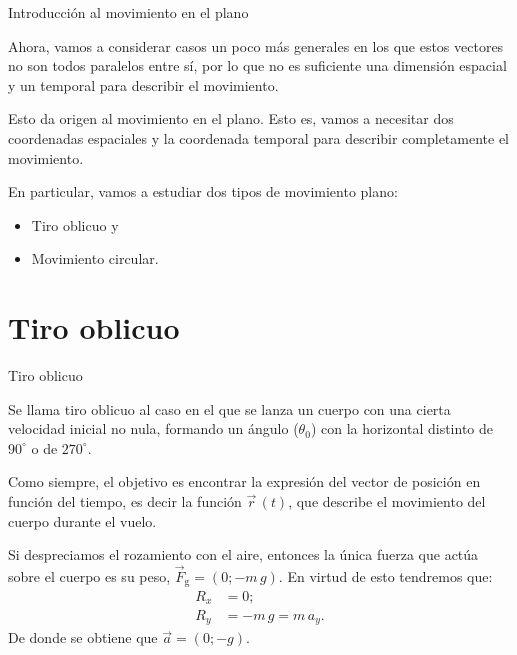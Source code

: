 \documentclass[11pt,handout,aspectratio=1610]{beamer}
\newcommand{\grado}[0]{^{\circ}}
\newcommand{\vs}{\vspace{11pt}}
\begin{document}
\begin{frame}{Introducción al movimiento en el plano}

    Ahora, vamos a considerar casos un poco más generales en los que estos vectores no son todos paralelos entre sí, por lo que no es suficiente una dimensión espacial y un temporal para describir el movimiento.

    \vs

    Esto da origen al movimiento en el plano. Esto es, vamos a necesitar dos coordenadas espaciales y la coordenada temporal para describir completamente el movimiento.

    \vs

    En particular, vamos a estudiar dos tipos de movimiento plano:
    \begin{itemize}
        \item Tiro oblicuo y 
        \item Movimiento circular.
    \end{itemize}

\end{frame}

\section{Tiro oblicuo}

\begin{frame}{Tiro oblicuo}

    Se llama tiro oblicuo al caso en el que se lanza un cuerpo con una cierta velocidad inicial no nula, formando un ángulo ($\theta_0$) con la horizontal distinto de $90\grado$ o de $270\grado$.

    \vs

    Como siempre, el objetivo es encontrar la expresión del vector de posición en función del tiempo, es decir la función $\vec{r} \, (t)$, que describe el movimiento del cuerpo durante el vuelo.

    \vs 

    Si despreciamos el rozamiento con el aire, entonces la única fuerza que actúa sobre el cuerpo es su peso, $\vec{F}_\text{g} = \left(0 ; - m \, g\right)$. En virtud de esto tendremos que:
    \begin{align*}
        R_x &= 0; \\
        R_y &= - m \, g = m \, a_y.
    \end{align*} De donde se obtiene que $\vec{a} = \left(0; -g\right)$.

\end{frame}
\end{document}

